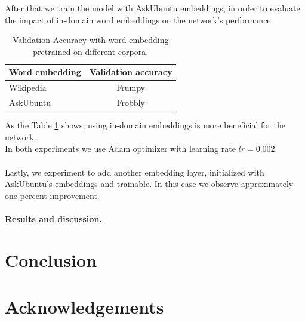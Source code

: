 \documentclass[10pt,twocolumn,letterpaper]{article}
\begin{document}
After that we train the model with AskUbuntu embeddings, in order to evaluate the impact of in-domain word embeddings on the network's performance. 
\begin{table}
\begin{center}
\begin{tabular}{|l|c|}
\hline\hline
Word embedding & Validation accuracy \\
\hline\hline
Wikipedia & Frumpy \\
AskUbuntu & Frobbly \\
\hline
\end{tabular}
\end{center}
\caption{Validation Accuracy with word embedding pretrained on different corpora.}
\label{table:accuracy}
\end{table}
As the Table \ref{table:accuracy} shows, using in-domain embeddings is more beneficial for the network. \\
In both experiments we use Adam optimizer with learning rate $ lr=0.002 $. \\~\\
Lastly, we experiment to add another embedding layer, initialized with AskUbuntu's embeddings and trainable. In this case we observe approximately one percent improvement.


\paragraph{Results and discussion.}


\section{Conclusion} 



\section*{Acknowledgements}


\appendix
\end{document}
